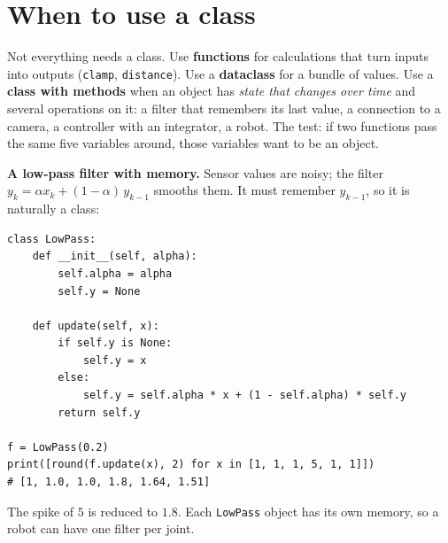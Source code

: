 \section*{When to use a class}
Not everything needs a class. Use \textbf{functions} for calculations that turn inputs into outputs (\texttt{clamp}, \texttt{distance}). Use a \textbf{dataclass} for a bundle of values. Use a \textbf{class with methods} when an object has \emph{state that changes over time} and several operations on it: a filter that remembers its last value, a connection to a camera, a controller with an integrator, a robot. The test: if two functions pass the same five variables around, those variables want to be an object.

\begin{example}
\textbf{A low-pass filter with memory.} Sensor values are noisy; the filter $y_k=\alpha x_k+(1-\alpha)\,y_{k-1}$ smooths them. It must remember $y_{k-1}$, so it is naturally a class:
\begin{verbatim}
class LowPass:
    def __init__(self, alpha):
        self.alpha = alpha
        self.y = None

    def update(self, x):
        if self.y is None:
            self.y = x
        else:
            self.y = self.alpha * x + (1 - self.alpha) * self.y
        return self.y

f = LowPass(0.2)
print([round(f.update(x), 2) for x in [1, 1, 1, 5, 1, 1]])
# [1, 1.0, 1.0, 1.8, 1.64, 1.51]
\end{verbatim}
The spike of $5$ is reduced to $1.8$. Each \texttt{LowPass} object has its own memory, so a robot can have one filter per joint.
\end{example}

